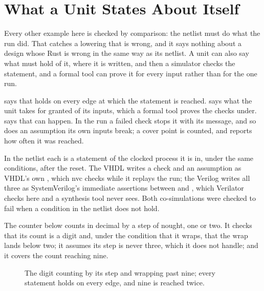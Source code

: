 \section{What a Unit States About Itself}
\label{sec:x-formal}

Every other example here is checked by comparison: the netlist must
do what the run did. That catches a lowering that is wrong, and it says
nothing about a design whose Rust is wrong in the same way as its
netlist. A unit can also say what must hold of it, where it is
written, and then a simulator checks the statement, and a formal tool
can prove it for every input rather than for the one run.

 says that  holds on every edge
at which the statement is reached.  says
what the unit takes for granted of its inputs, which a formal tool
proves the checks under.  says that
 can happen. In the run a failed check stops it with its
message, and so does an assumption its own inputs break; a cover
point is counted, and  reports how often it was reached.

In the netlist each is a statement of the clocked process it is in,
under the same conditions, after the reset. The VHDL writes a check
and an assumption as VHDL's own , which nvc checks while
it replays the run; the Verilog writes all three as SystemVerilog's
immediate assertions between  and ,
which Verilator checks here and a synthesis tool never sees. Both
co-simulations were checked to fail when a condition in the netlist
does not hold.

The counter below counts in decimal by a step of nought, one or two.
It checks that its count is a digit and, under the condition that it
wraps, that the wrap lands below two; it assumes its step is never
three, which it does not handle; and it covers the count reaching
nine.

\begin{figure}[htbp]
\centering

\caption{The digit counting by its step and wrapping past nine; every
statement holds on every edge, and nine is reached twice.}
\label{fig:x-formal}
\end{figure}




